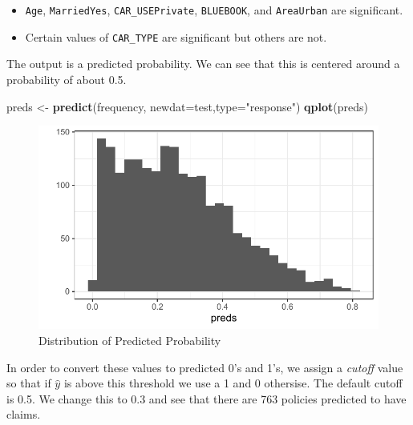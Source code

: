 \documentclass[openany]{book}
\newenvironment{Shaded}{\begin{snugshade}}{\end{snugshade}}
\newcommand{\DataTypeTok}[1]{\textcolor[rgb]{0.13,0.29,0.53}{#1}}
\newcommand{\DecValTok}[1]{\textcolor[rgb]{0.00,0.00,0.81}{#1}}
\newcommand{\KeywordTok}[1]{\textcolor[rgb]{0.13,0.29,0.53}{\textbf{#1}}}
\newcommand{\NormalTok}[1]{#1}
\newcommand{\OperatorTok}[1]{\textcolor[rgb]{0.81,0.36,0.00}{\textbf{#1}}}
\newcommand{\StringTok}[1]{\textcolor[rgb]{0.31,0.60,0.02}{#1}}
\providecommand{\tightlist}{%
  \setlength{\itemsep}{0pt}\setlength{\parskip}{0pt}}
\begin{document}
\begin{itemize}
\tightlist
\item
  \texttt{Age}, \texttt{MarriedYes}, \texttt{CAR\_USEPrivate}, \texttt{BLUEBOOK}, and \texttt{AreaUrban} are significant.
\item
  Certain values of \texttt{CAR\_TYPE} are significant but others are not.
\end{itemize}

The output is a predicted probability. We can see that this is centered around a probability of about 0.5.

\begin{Shaded}
\begin{Highlighting}[]
\NormalTok{preds <-}\StringTok{ }\KeywordTok{predict}\NormalTok{(frequency, }\DataTypeTok{newdat=}\NormalTok{test,}\DataTypeTok{type=}\StringTok{"response"}\NormalTok{)}
\KeywordTok{qplot}\NormalTok{(preds) }
\end{Highlighting}
\end{Shaded}

\begin{figure}
\centering
\includegraphics{05-linear-models_files/figure-latex/unnamed-chunk-29-1.pdf}
\caption{\label{fig:unnamed-chunk-29}Distribution of Predicted Probability}
\end{figure}

In order to convert these values to predicted 0's and 1's, we assign a \emph{cutoff} value so that if \(\hat{y}\) is above this threshold we use a 1 and 0 othersise. The default cutoff is 0.5. We change this to 0.3 and see that there are 763 policies predicted to have claims.

\begin{Shaded}
\end{Shaded}
\end{document}
